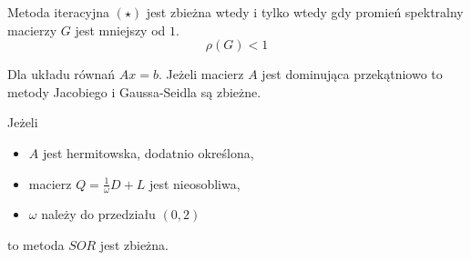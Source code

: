 \documentclass[../mn-notatki.tex]{subfiles}
\begin{document}
\begin{tcolorbox}
Metoda iteracyjna $(\star)$ jest zbieżna wtedy i tylko wtedy gdy promień
spektralny macierzy $G$ jest mniejszy od $1$.
\[
\rho(G) < 1
\]
\end{tcolorbox}

\begin{tcolorbox}
Dla układu równań $Ax = b$. Jeżeli macierz $A$ jest dominująca przekątniowo
to metody Jacobiego i Gaussa-Seidla są zbieżne.
\end{tcolorbox}

\begin{tcolorbox}
Jeżeli
\begin{itemize}
    \item $A$ jest hermitowska, dodatnio określona,
    \item macierz $Q = \frac{1}{\omega} D + L$ jest nieosobliwa,
    \item $\omega$ należy do przedziału $(0,2)$
\end{itemize}
to metoda $SOR$ jest zbieżna.
\end{tcolorbox}

\pagebreak
\end{document}
